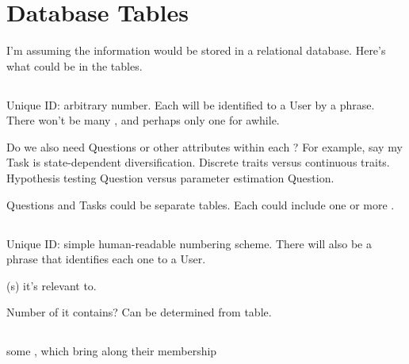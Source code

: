 \section{Database Tables}

I'm assuming the information would be stored in a relational database.
Here's what could be in the tables.

\subsection{\Task}

Unique ID: arbitrary number.
Each \Task will be identified to a User by a phrase.
There won't be many \Tasks, and perhaps only one for awhile.

Do we also need Questions or other attributes within each \Task?
For example, say my Task is state-dependent diversification.
Discrete traits versus continuous traits.
Hypothesis testing Question versus parameter estimation Question.

Questions and Tasks could be separate tables.
Each \Task could include one or more \Question.

\subsection{\Refset}

Unique ID: simple human-readable numbering scheme.
There will also be a phrase that identifies each one to a User.

\Task(s) it's relevant to.

Number of \Elements it contains?  Can be determined from \Elements table.

\subsection{\Benchmark}

some \Elements, which bring along their \Refset membership

\subsection{\Element}

